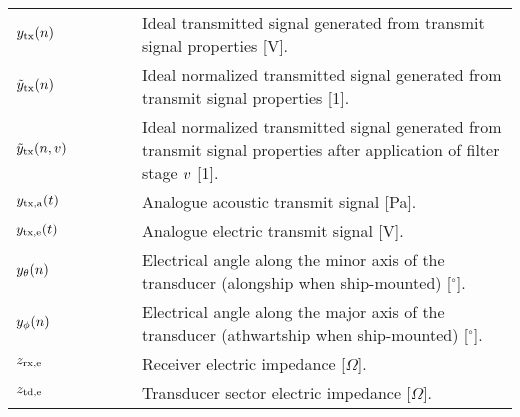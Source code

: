\documentclass[preprint,12pt,TurnOnLineNumbers]{JASAnew}
\begin{document}
\begin{longtable}{p{0.25\linewidth} p{0.75\linewidth}}
$y_{\textrm{tx}}(n)$ & Ideal transmitted signal generated from transmit signal properties [V].\\
$\tilde{y}_{\textrm{tx}}(n)$ & Ideal normalized transmitted signal generated from transmit signal properties [1].\\
$\tilde{y}_{\textrm{tx}}(n,v)$ & Ideal normalized transmitted signal generated from transmit signal properties after application of filter stage $v$ [1].\\

$y_{\textrm{tx,a}}(t)$ & Analogue acoustic transmit signal [Pa].\\

$y_{\textrm{tx,e}}(t)$ & Analogue electric transmit signal [V].\\

$y_\theta(n)$ & Electrical angle along the minor axis of the transducer (alongship when ship-mounted) [$^{\circ}$].\\
$y_\phi(n)$ & Electrical angle along the major axis of the transducer (athwartship when ship-mounted) [$^{\circ}$].\\

$z_{\textrm{rx,e}}$ & Receiver electric impedance [$\Omega$].\\
$z_{\textrm{td,e}}$ & Transducer sector electric impedance [$\Omega$].\\


\end{longtable}
\end{document}
